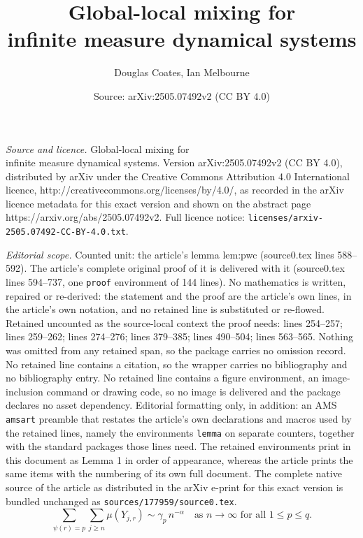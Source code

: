 \documentclass[10pt,a4paper]{amsart}
\title{Global-local mixing for \\ infinite measure dynamical systems}
\author{Douglas Coates, Ian Melbourne}
\date{Source: arXiv:2505.07492v2 (CC BY 4.0)}
\begin{document}
\maketitle

\noindent\emph{Source and licence.} Global-local mixing for \\ infinite measure dynamical systems. Version arXiv:2505.07492v2 (CC BY 4.0), distributed by arXiv under the Creative Commons Attribution 4.0 International licence, http://creativecommons.org/licenses/by/4.0/, as recorded in the arXiv licence metadata for this exact version and shown on the abstract page https://arxiv.org/abs/2505.07492v2. Full licence notice: \texttt{licenses/arxiv-2505.07492-CC-BY-4.0.txt}.\par\smallskip

\noindent\textit{Editorial scope.} Counted unit: the article's lemma lem:pwc (source0.tex lines 588--592). The article's complete original proof of it is delivered with it (source0.tex lines 594--737, one \texttt{proof} environment of 144 lines). No mathematics is written, repaired or re-derived: the statement and the proof are the article's own lines, in the article's own notation, and no retained line is substituted or re-flowed.  Retained uncounted as the source-local context the proof needs: lines 254--257; lines 259--262; lines 274--276; lines 379--385; lines 490--504; lines 563--565.  Nothing was omitted from any retained span, so the package carries no omission record.  No retained line contains a citation, so the wrapper carries no bibliography and no bibliography entry.  No retained line contains a figure environment, an image-inclusion command or drawing code, so no image is delivered and the package declares no asset dependency.  Editorial formatting only, in addition: an AMS \texttt{amsart} preamble that restates the article's own declarations and macros used by the retained lines, namely the environments \texttt{lemma} on separate counters, together with the standard packages those lines need.  The retained environments print in this document as Lemma 1 in order of appearance, whereas the article prints the same items with the numbering of its own full document.  The complete native source of the article as distributed in the arXiv e-print for this exact version is bundled unchanged as \texttt{sources/177959/source0.tex}.
\begin{equation} \label{eq:Y}
\sum_{\psi(r)=p}\sum_{j\ge n}\mu(Y_{j,r}) \sim \gamma_p \, n^{-\alpha}
\quad\text{as $n\to\infty$ for all $1\le p\le q$.}
\end{equation}
\end{document}
